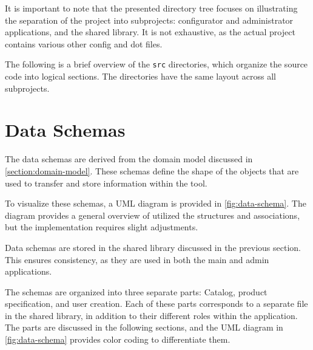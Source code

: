 It is important to note that the presented directory tree focuses on illustrating the separation of the project into subprojects: configurator and administrator applications, and the shared library. It is not exhaustive, as the actual project contains various other config and dot files.

The following is a brief overview of the \texttt{src} directories, which organize the source code into logical sections. The directories have the same layout across all subprojects.

\vspace{12pt}
\vspace{16pt}

\section{Data Schemas}

The data schemas are derived from the domain model discussed in \autoref{section:domain-model}. These schemas define the shape of the objects that are used to transfer and store information within the tool. 

To visualize these schemas, a UML diagram is provided in \autoref{fig:data-schema}. The diagram provides a general overview of utilized the structures and associations, but the implementation requires slight adjustments.

Data schemas are stored in the shared library discussed in the previous section. This ensures consistency, as they are used in both the main and admin applications. 

The schemas are organized into three separate parts: Catalog, product specification, and user creation. Each of these parts corresponds to a separate file in the shared library, in addition to their different roles within the application. The parts are discussed in the following sections, and the UML diagram in \autoref{fig:data-schema} provides color coding to differentiate them.

